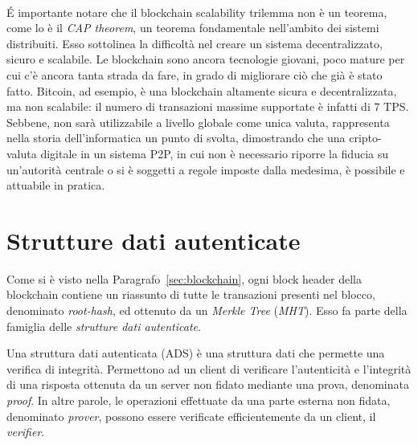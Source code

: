 \paragraph*{}
\'E importante notare che il blockchain scalability trilemma non è un teorema, come lo è il \textit{CAP theorem}, un teorema fondamentale nell'ambito dei sistemi distribuiti. Esso sottolinea la difficoltà nel creare un sistema decentralizzato, sicuro e scalabile. Le blockchain sono ancora tecnologie giovani, poco mature per cui c'è ancora tanta strada da fare, in grado di migliorare ciò che già è stato fatto. Bitcoin, ad esempio, è una blockchain altamente sicura e decentralizzata, ma non scalabile: il numero di transazioni massime supportate è infatti di 7 TPS. Sebbene, non sarà utilizzabile a livello globale come unica valuta, rappresenta nella storia dell'informatica un punto di svolta, dimostrando che una cripto-valuta digitale in un sistema P2P, in cui non è necessario riporre la fiducia su un'autorità centrale o si è soggetti a regole imposte dalla medesima, è possibile e attuabile in pratica.


\section{Strutture dati autenticate}\label{sec:ads}

Come si è visto nella Paragrafo~\ref{sec:blockchain}, ogni block header della blockchain contiene un riassunto di tutte le transazioni presenti nel blocco, denominato \emph{root-hash}, ed ottenuto da un \textit{Merkle Tree} (\textit{MHT}). Esso fa parte della famiglia delle \emph{strutture dati autenticate}.

Una struttura dati autenticata (ADS) è una struttura dati che permette una verifica di integrità. Permettono ad un client di verificare l'autenticità e l'integrità di una risposta ottenuta da un server non fidato mediante una prova, denominata \emph{proof}. In altre parole, le operazioni effettuate da una parte esterna non fidata, denominato \emph{prover}, possono essere verificate efficientemente da un client, il \emph{verifier}.

